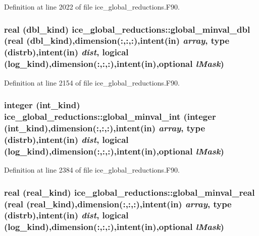 Definition at line 2022 of file ice\_\-global\_\-reductions.F90.\hypertarget{namespaceice__global__reductions_a7c09e90ceb0de6d5f40a525cabbc193a}{
\subsubsection[{global\_\-minval\_\-dbl}]{\setlength{\rightskip}{0pt plus 5cm}real (dbl\_\-kind) ice\_\-global\_\-reductions::global\_\-minval\_\-dbl (real (dbl\_\-kind),dimension(:,:,:),intent(in) {\em array}, \/  type (distrb),intent(in) {\em dist}, \/  logical (log\_\-kind),dimension(:,:,:),intent(in),optional {\em lMask})}}
\label{namespaceice__global__reductions_a7c09e90ceb0de6d5f40a525cabbc193a}


Definition at line 2154 of file ice\_\-global\_\-reductions.F90.\hypertarget{namespaceice__global__reductions_a6158397f98e574f0c587459b40db8d18}{
\subsubsection[{global\_\-minval\_\-int}]{\setlength{\rightskip}{0pt plus 5cm}integer (int\_\-kind) ice\_\-global\_\-reductions::global\_\-minval\_\-int (integer (int\_\-kind),dimension(:,:,:),intent(in) {\em array}, \/  type (distrb),intent(in) {\em dist}, \/  logical (log\_\-kind),dimension(:,:,:),intent(in),optional {\em lMask})}}
\label{namespaceice__global__reductions_a6158397f98e574f0c587459b40db8d18}


Definition at line 2384 of file ice\_\-global\_\-reductions.F90.\hypertarget{namespaceice__global__reductions_a98165af03a1ac68b1a6114c63d9b7b11}{
\subsubsection[{global\_\-minval\_\-real}]{\setlength{\rightskip}{0pt plus 5cm}real (real\_\-kind) ice\_\-global\_\-reductions::global\_\-minval\_\-real (real (real\_\-kind),dimension(:,:,:),intent(in) {\em array}, \/  type (distrb),intent(in) {\em dist}, \/  logical (log\_\-kind),dimension(:,:,:),intent(in),optional {\em lMask})}}
\label{namespaceice__global__reductions_a98165af03a1ac68b1a6114c63d9b7b11}



